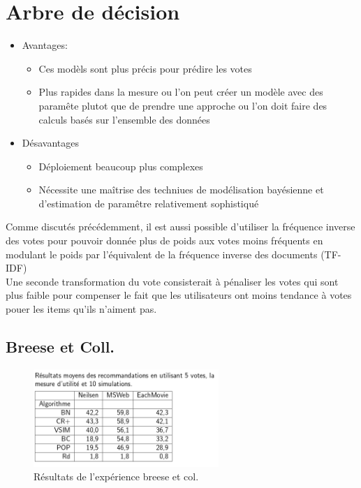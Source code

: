 \documentclass[oneside]{book}
\begin{document}
\section{Arbre de décision}
\begin{itemize}
\item Avantages:
\begin{itemize}
\item Ces modèls sont plus précis pour prédire les votes
\item Plus rapides dans la mesure ou l'on peut créer un modèle avec des paramête plutot que de prendre une approche ou l'on doit faire des calculs basés sur l'ensemble des données
\end{itemize}
\item Désavantages
\begin{itemize}
\item Déploiement beaucoup plus complexes
\item Nécessite une maîtrise des techniues de modélisation bayésienne et d'estimation de paramêtre relativement sophistiqué
\end{itemize}
\end{itemize}

Comme discutés précédemment, il est aussi possible d'utiliser la fréquence inverse des votes pour pouvoir donnée plus de poids aux votes moins fréquents en modulant le poids par l'équivalent de la fréquence inverse des documents (TF-IDF)\\

Une seconde transformation du vote consisterait à pénaliser les votes qui sont plus faible pour compenser le fait que les utilisateurs ont moins tendance à votes pouer les items qu'ils n'aiment pas.

\subsection{Breese et Coll.}
\begin{figure}[!ht]
\centering
\includegraphics[width = 7cm]{breese.png}
\caption{Résultats de l'expérience breese et col.}
\label{fig:breese}
\end{figure}
\end{document}
